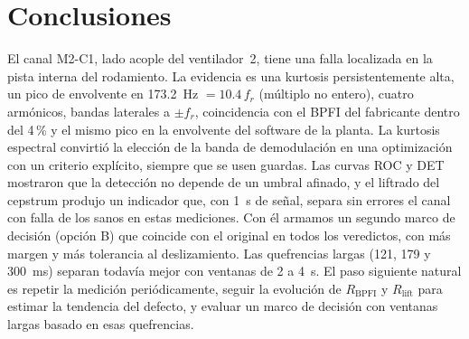 \documentclass[conference,a4paper]{IEEEtran}
\newcommand{\Rb}{R_{\mathrm{BPFI}}}
\newcommand{\Rl}{R_{\mathrm{lift}}}
\begin{document}
\section{Conclusiones}

El canal M2-C1, lado acople del ventilador~2, tiene una falla localizada en la pista interna del rodamiento. La evidencia es una kurtosis persistentemente alta, un pico de envolvente en 173.2~Hz $=10.4\,f_r$ (múltiplo no entero), cuatro armónicos, bandas laterales a $\pm f_r$, coincidencia con el BPFI del fabricante dentro del 4\,\% y el mismo pico en la envolvente del software de la planta. La kurtosis espectral convirtió la elección de la banda de demodulación en una optimización con un criterio explícito, siempre que se usen guardas. Las curvas ROC y DET mostraron que la detección no depende de un umbral afinado, y el liftrado del cepstrum produjo un indicador que, con 1~s de señal, separa sin errores el canal con falla de los sanos en estas mediciones. Con él armamos un segundo marco de decisión (opción B) que coincide con el original en todos los veredictos, con más margen y más tolerancia al deslizamiento. Las quefrencias largas (121, 179 y 300~ms) separan todavía mejor con ventanas de 2 a 4~s. El paso siguiente natural es repetir la medición periódicamente, seguir la evolución de $\Rb$ y $\Rl$ para estimar la tendencia del defecto, y evaluar un marco de decisión con ventanas largas basado en esas quefrencias.
\end{document}
